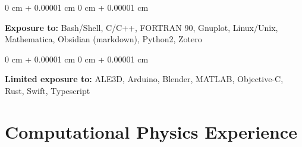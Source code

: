 \documentclass[10pt, letterpaper]{article}
\newenvironment{onecolentry}{
    \begin{adjustwidth}{
        0 cm + 0.00001 cm
    }{
        0 cm + 0.00001 cm
    }
}{
    \end{adjustwidth}
} %
\begin{document}
        \vspace{0.2 cm}

        \begin{onecolentry}
          \textbf{Exposure to:} Bash/Shell, C/C++, FORTRAN 90, Gnuplot, Linux/Unix, Mathematica, Obsidian (markdown), Python2, Zotero
        \end{onecolentry}

        \vspace{0.2 cm}

        \begin{onecolentry}
          \textbf{Limited exposure to:} ALE3D, Arduino, Blender, MATLAB, Objective-C, Rust, Swift, Typescript
        \end{onecolentry}

    \section{Computational Physics Experience}
\end{document}
